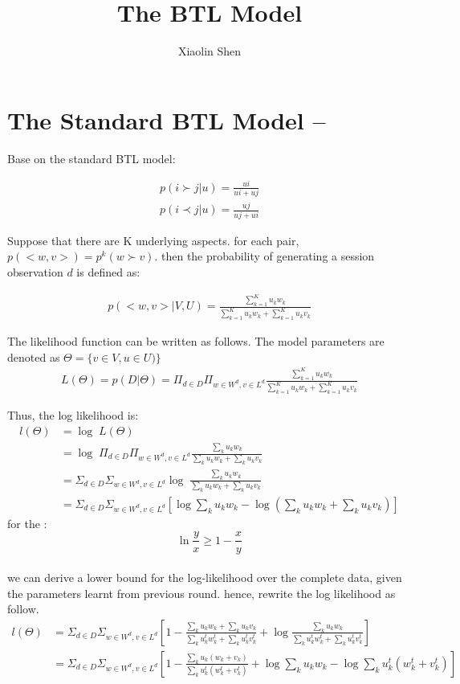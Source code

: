 \documentclass{article}
\title{The BTL Model}
\author{Xiaolin Shen}
\begin{document}
\maketitle


\section{The Standard BTL Model --}
Base on the standard BTL model:

\begin{align*}
	p(i \succ j |u)=\frac{ui}{ui+ uj} \\
	p(i \prec j |u)=\frac{uj}{uj+ ui}
\end{align*}

 Suppose that there are K underlying aspects. for each pair, $p(<w,v>) = p^k(w\succ v) $. then the probability of generating a session observation $d$ is defined as:

\begin{align}
p(<w,v>|V,U)
= \frac{\sum_{k=1}^{K} u_k w_k}{\sum_{k=1}^{K} u_k w_k+ \sum_{k=1}^{K} u_k v_k}
\end{align}

The likelihood function can be written as follows. The model parameters are denoted as $ \Theta = \{ v \in V ,u \in U ) \}$
\begin{align}
L(\Theta)=p(D|\Theta)
=\Pi_{d \in D} \Pi_{w\in W^d, v\in L^d} \frac{\sum_{k=1}^{K} u_k w_k}{\sum_{k=1}^{K} u_k w_k+ \sum_{k=1}^{K} u_k v_k}
\end{align}

Thus, the log likelihood is:
\begin{align}
l(\Theta) &= \log \; L(\Theta) \\
& =\log \; \Pi_{d \in D} \Pi_{w\in W^d, v\in L^d} \frac{\sum_k u_k w_k}{\sum_k u_k w_k+ \sum_k u_k v_k}\\ \nonumber
& =\Sigma_{d \in D} \Sigma_{w\in W^d, v\in L^d} \log \;  \frac{\sum_k u_k w_k}{\sum_k u_k w_k+ \sum_k u_k v_k}\\ \nonumber
& =\Sigma_{d \in D} \Sigma_{w\in W^d, v\in L^d} [\log \sum_k u_k w_k-\log (\sum_k u_k w_k+ \sum_k u_k v_k)]
\end{align}
for the :
\begin{equation*}
\ln \frac{y}{x} \geq 1- \frac{x}{y}
\end{equation*}\\
we can derive a lower bound for the log-likelihood over the complete data, given the parameters learnt from previous round.
hence, rewrite the log likelihood as follow.
\begin{align}
l(\Theta)
& = \Sigma_{d \in D} \Sigma_{w\in W^d, v\in L^d} [1- \frac{\sum_k u_k w_k+ \sum_k u_k v_k}{\sum_k u_k^t w_k^t + \sum_k u_k^t v_k^t} + \log \frac{\sum_k u_k w_k}{\sum_k u_k^t w_k^t + \sum_k u_k^t v_k^t}]\\
& = \Sigma_{d \in D} \Sigma_{w\in W^d, v\in L^d} [1- \frac{\sum_k u_k(w_k+v_k)}{\sum_k u_k^t(w_k^t +v_k^t)}+ \log \sum_k u_k w_k -\log \sum_k u_k^t (w_k^t+v_k^t)]
\end{align}
\end{document}
